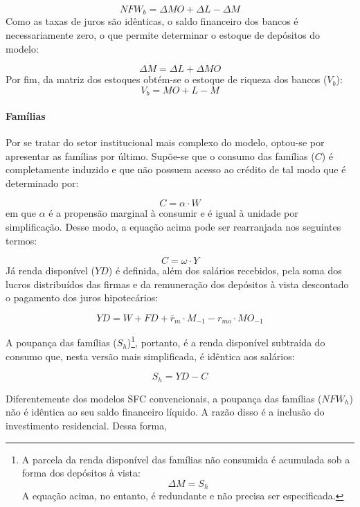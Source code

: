$$
NFW_b = \Delta MO + \Delta L - \Delta M
$$
Como as taxas de juros são idênticas, o saldo financeiro dos bancos é necessariamente zero, o que permite determinar o estoque de depósitos do modelo:

\begin{equation}
    \Delta M = \Delta L + \Delta MO
\end{equation}
Por fim, da matriz dos estoques obtém-se o estoque de riqueza dos bancos ($V_b$):
\begin{equation}
    V_b = MO + L - M
\end{equation}

\paragraph*{Famílias} 
Por se tratar do setor institucional mais complexo do modelo, optou-se por apresentar as famílias por último. Supõe-se que o consumo das famílias ($C$) é completamente induzido e que não possuem acesso ao crédito de tal modo que é determinado por:

\begin{equation}
    C = \alpha\cdot W
\end{equation}
em que $\alpha$ é a propensão marginal à consumir e é igual à unidade por simplificação. Desse modo, a equação acima pode ser rearranjada nos seguintes termos:

$$
C = \omega\cdot Y
$$
Já renda disponível ($YD$) é definida, além dos salários recebidos, pela soma dos lucros distribuídos das firmas e da remuneração dos depósitos à vista descontado o pagamento dos juros hipotecários:

\begin{equation}
    \label{EqYD}
    YD = W + FD + \overline r_m\cdot M_{-1} - r_{mo}\cdot MO_{-1}
\end{equation}

A poupança das famílias ($S_h$)\footnote{
A parcela da renda disponível das famílias não consumida é acumulada sob a forma dos depósitos à vista:
$$
\Delta M = S_h
$$
A equação acima, no entanto, é redundante e não precisa ser especificada.}, portanto, é a renda disponível subtraída do consumo que, nesta versão mais simplificada, é idêntica aos salários:

\begin{equation}
    \label{EqSh}
    S_h = YD - C
\end{equation}

Diferentemente dos modelos SFC convencionais, a poupança das famílias ($NFW_h$) não é idêntica ao seu saldo financeiro líquido. A razão disso é a inclusão do investimento residencial. Dessa forma, 

